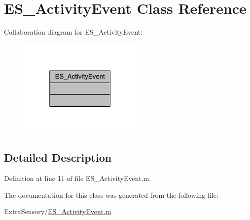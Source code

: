 \hypertarget{class_e_s___activity_event}{\section{E\+S\+\_\+\+Activity\+Event Class Reference}
\label{class_e_s___activity_event}
}


Collaboration diagram for E\+S\+\_\+\+Activity\+Event\+:\nopagebreak
\begin{figure}[H]
\begin{center}
\leavevmode
\includegraphics[width=172pt]{d8/dee/class_e_s___activity_event__coll__graph}
\end{center}
\end{figure}


\subsection{Detailed Description}


Definition at line 11 of file E\+S\+\_\+\+Activity\+Event.\+m.



The documentation for this class was generated from the following file\+:\begin{DoxyCompactItemize}
\item 
Extra\+Sensory/\hyperlink{_e_s___activity_event_8m}{E\+S\+\_\+\+Activity\+Event.\+m}\end{DoxyCompactItemize}
